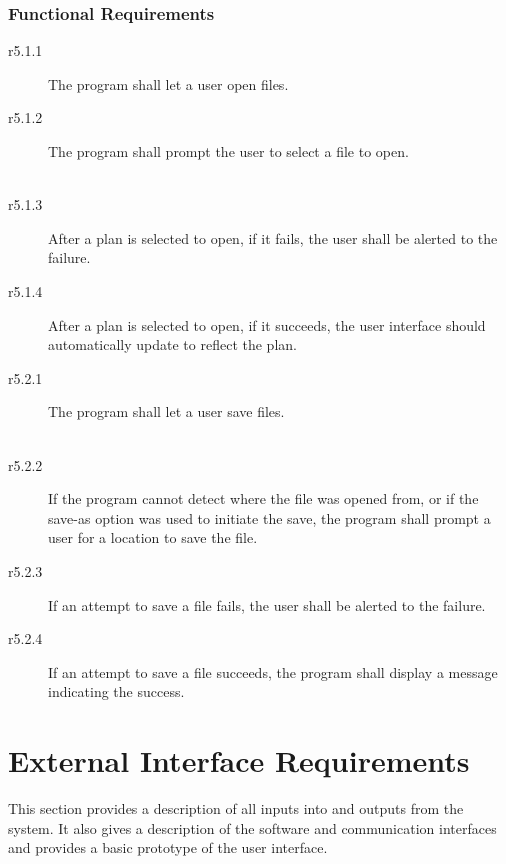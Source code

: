 \documentclass[12pt, letterpaper]{article}
\begin{document}
          \subsubsection{Functional Requirements}
            \begin{description}
              \item[r5.1.1] The program shall let a user open files. \\
              \item[r5.1.2] The program shall prompt the user to select a file to open. \\ \
              \item[r5.1.3] After a plan is selected to open, if it fails, the user shall be alerted to the failure. \\
              \item[r5.1.4] After a plan is selected to open, if it succeeds, the user interface should automatically update to reflect the plan. \\
              \item[r5.2.1] The program shall let a user save files. \\ \
              \item[r5.2.2] If the program cannot detect where the file was opened from,
                         or if the save-as option was used to initiate the save, the program shall prompt a user for a location to save the file. \\
              \item[r5.2.3] If an attempt to save a file fails, the user shall be alerted to the failure. \\
              \item[r5.2.4] If an attempt to save a file succeeds, the program shall display a message indicating the success. \\
            \end{description}
          \newpage
\section{External Interface Requirements}
  This section provides a description of all inputs into and outputs from the system.
  It also gives a description of the software and communication interfaces and provides a basic prototype of the user interface.
\end{document}
